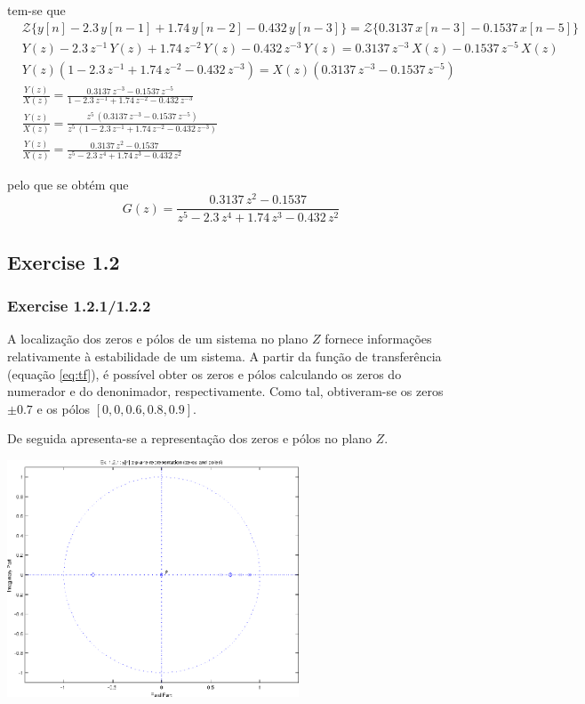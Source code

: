 \documentclass[a4paper]{article}
\begin{document}
\noindent tem-se que
\begin{eqnarray}
	&\mathcal{Z}\{y[n] - 2.3 \, y[n - 1] + 1.74 \, y[n - 2] - 0.432 \, y[n - 3]\} = \mathcal{Z}\{0.3137 \, x[n - 3] - 0.1537 \, x[n - 5]\} \\
	&Y(z) - 2.3 \, z^{-1} \, Y(z) + 1.74 \, z^{-2} \, Y(z) - 0.432 \, z^{-3} \, Y(z) = 0.3137 \, z^{-3} \, X(z) - 0.1537 \, z^{-5} \, X(z) \\
	&Y(z) (1 - 2.3 \, z^{-1} + 1.74 \, z^{-2} - 0.432 \, z^{-3}) = X(z)(0.3137 \, z^{-3} - 0.1537 \, z^{-5}) \\
	&\frac{Y(z)}{X(z)} = \frac{0.3137 \, z^{-3} - 0.1537 \, z^{-5}}{1 - 2.3 \, z^{-1} + 1.74 \, z^{-2} - 0.432 \, z^{-3}} \\
	&\frac{Y(z)}{X(z)} = \frac{z^{5} \, (0.3137 \, z^{-3} - 0.1537 \, z^{-5})}{z^{5} \, (1 - 2.3 \, z^{-1} + 1.74 \, z^{-2} - 0.432 \, z^{-3})} \\
	&\frac{Y(z)}{X(z)} = \frac{0.3137 \, z^{2} - 0.1537}{z^{5} - 2.3 \, z^{4} + 1.74 \, z^{3} - 0.432 \, z^{2}}
\end{eqnarray}

\noindent pelo que se obtém que
\begin{equation}
	\label{eq:tf}
	G(z) = \frac{0.3137 \, z^{2} - 0.1537}{z^{5} - 2.3 \, z^{4} + 1.74 \, z^{3} - 0.432 \, z^{2}}
\end{equation}

\subsection{Exercise 1.2}
\subsubsection{Exercise 1.2.1/1.2.2}
\noindent A localização dos zeros e pólos de um sistema no plano $Z$ fornece informações relativamente à estabilidade de um sistema. A partir da função de transferência (equação \ref{eq:tf}), é possível obter os zeros e pólos calculando os zeros do numerador e do denonimador, respectivamente. Como tal, obtiveram-se os zeros $\pm 0.7$ e os pólos $[0, 0, 0.6, 0.8, 0.9]$.

\noindent De seguida apresenta-se a representação dos zeros e pólos no plano $Z$.
\begin{center}
	\includegraphics[width=0.65\textwidth]{images/ex1_2_1.png}
	\label{fig:ex1_2_1_zplane}
\end{center}
\end{document}
